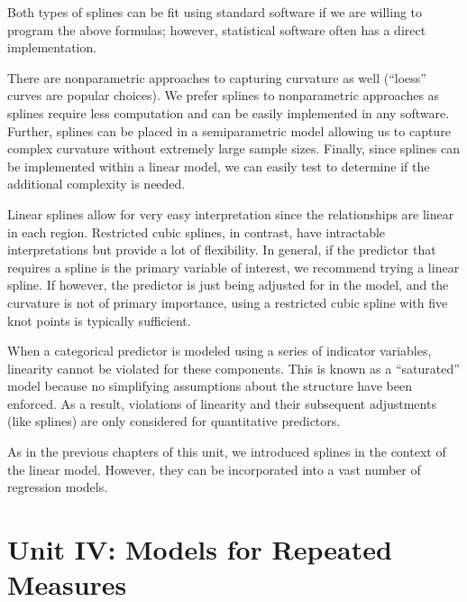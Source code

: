 \documentclass[
  letterpaper,
  DIV=11,
  numbers=noendperiod]{scrreprt}
\theoremstyle{definition}
\theoremstyle{definition}
\theoremstyle{remark}
\begin{document}
Both types of splines can be fit using standard software if we are
willing to program the above formulas; however, statistical software
often has a direct implementation.

There are nonparametric approaches to capturing curvature as well
(``loess'' curves are popular choices). We prefer splines to
nonparametric approaches as splines require less computation and can be
easily implemented in any software. Further, splines can be placed in a
semiparametric model allowing us to capture complex curvature without
extremely large sample sizes. Finally, since splines can be implemented
within a linear model, we can easily test to determine if the additional
complexity is needed.

Linear splines allow for very easy interpretation since the
relationships are linear in each region. Restricted cubic splines, in
contrast, have intractable interpretations but provide a lot of
flexibility. In general, if the predictor that requires a spline is the
primary variable of interest, we recommend trying a linear spline. If
however, the predictor is just being adjusted for in the model, and the
curvature is not of primary importance, using a restricted cubic spline
with five knot points is typically sufficient.

\begin{tcolorbox}[enhanced jigsaw, left=2mm, toprule=.15mm, arc=.35mm, breakable, opacitybacktitle=0.6, opacityback=0, rightrule=.15mm, colbacktitle=quarto-callout-note-color!10!white, coltitle=black, leftrule=.75mm, toptitle=1mm, colframe=quarto-callout-note-color-frame, titlerule=0mm, title=\textcolor{quarto-callout-note-color}{\faInfo}\hspace{0.5em}{Note}, bottomrule=.15mm, colback=white, bottomtitle=1mm]

When a categorical predictor is modeled using a series of indicator
variables, linearity cannot be violated for these components. This is
known as a ``saturated'' model because no simplifying assumptions about
the structure have been enforced. As a result, violations of linearity
and their subsequent adjustments (like splines) are only considered for
quantitative predictors.

\end{tcolorbox}

As in the previous chapters of this unit, we introduced splines in the
context of the linear model. However, they can be incorporated into a
vast number of regression models.

\part{Unit IV: Models for Repeated Measures}
\end{document}
